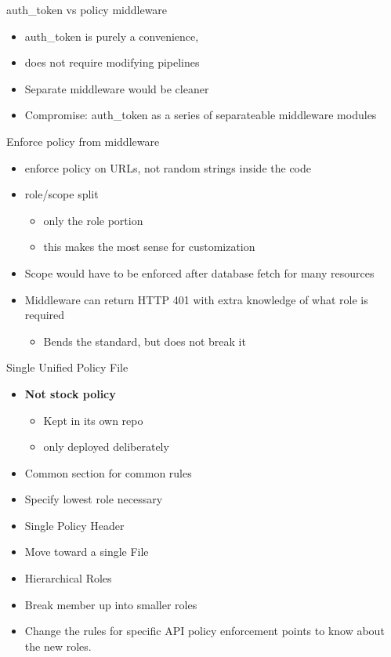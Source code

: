 \documentclass{beamer}
\begin{document}
\begin{frame}{auth\_token vs policy middleware}
  \begin{itemize}
  \item auth\_token is purely a convenience, 
  \item does not require modifying pipelines
  \item Separate middleware would be cleaner
  \item Compromise: auth\_token as a series of separateable middleware modules
  \end{itemize}
\end{frame}

\begin{frame}{Enforce policy from middleware}
  \begin{itemize}
  \item enforce policy on URLs, not random strings inside the code
  \item role/scope split
    \begin{itemize}
    \item only the role portion
    \item this makes the most sense for customization
    \end{itemize}
  \item Scope would have to be enforced after database fetch for many resources
  \item Middleware can return HTTP 401 with extra knowledge of what role is required
    \begin{itemize}
    \item Bends the standard, but does not break it
    \end{itemize}
  \end{itemize}
\end{frame}


\begin{frame}{Single Unified Policy File}
  
  \begin{itemize}
  \item  \textbf{Not stock policy}
    \begin{itemize}
    \item Kept in its own repo
    \item only deployed deliberately
    \end {itemize}
  \item Common section for common rules
  \item Specify lowest role necessary
  \item Single Policy Header
  \item Move toward a single File
  \item Hierarchical Roles
  \item Break member up into smaller roles
  \item Change the rules for specific API policy enforcement points to know about the new roles.
  \end{itemize}
\end{frame}
\end{document}
